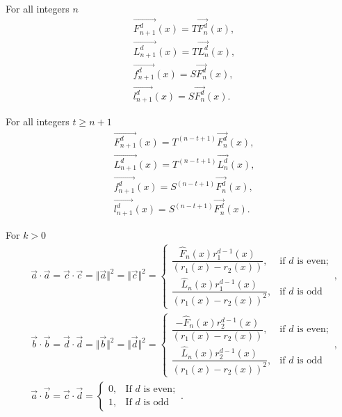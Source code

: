   \begin{theorem}
 For all integers $n$
  \begin{align*}
  &\stackrel{\rightarrow}{F_{n+1}^d}(x) =T \stackrel{\rightarrow}{F_{n}^d}(x),\\ 
  &\stackrel{\rightarrow}{L_{n+1}^d}(x)=T \stackrel{\rightarrow}{L_{n}^d}(x), \\
 & \stackrel{\rightarrow}{f_{n+1}^d}(x) =S \stackrel{\rightarrow}{F_{n}^d}(x),\\ 
  &\stackrel{\rightarrow}{l_{n+1}^d}(x) =S \stackrel{\rightarrow}{F_{n}^d}(x). 
 \end{align*}
 \end{theorem} 
 \begin{theorem}
For all integers $t\geq n + 1$
  \begin{align*}
   &\stackrel{\rightarrow}{F_{n+1}^d}(x) =T^{(n-t+1)} \stackrel{\rightarrow}{F_{n}^d}(x),\\ 
  & \stackrel{\rightarrow}{L_{n+1}^d}(x) =T^{(n-t+1)} \stackrel{\rightarrow}{L_{n}^d}(x),\\
 & \stackrel{\rightarrow}{f_{n+1}^d}(x) =S^{(n-t+1)} \stackrel{\rightarrow}{F_{n}^d}(x),\\
  &\stackrel{\rightarrow}{l_{n+1}^d}(x) =S^{(n-t+1)} \stackrel{\rightarrow}{F_{n}^d}(x). 
\end{align*}
\end{theorem}
\begin{theorem} For $k > 0$
\begin{align*}
&\stackrel{\rightarrow}{a}\cdot  \stackrel{\rightarrow}{a} = \stackrel{\rightarrow}{c}\cdot  \stackrel{\rightarrow}{c} = \Vert \stackrel{\rightarrow}{a} \Vert^2 = \Vert \stackrel{\rightarrow}{c} \Vert^2  =
 \begin{cases}
 \dfrac{\widehat{F}_{n}(x)r_1^{d-1}(x)}{(r_1(x) - r_2(x))}, & \text {if $d$ is even};\\
\dfrac{\widehat{L}_{n}(x)r_1^{d-1}(x)}{(r_1(x) - r_2(x))^2}, & \text{if $d$ is odd}
 \end{cases},\\
 &\stackrel{\rightarrow}{b}\cdot  \stackrel{\rightarrow}{b}=\stackrel{\rightarrow}{d}\cdot  \stackrel{\rightarrow}{d}  =  \Vert \stackrel{\rightarrow}{b} \Vert^2 = \Vert \stackrel{\rightarrow}{d} \Vert^2 =
 \begin{cases}
 \dfrac{- \widehat{F}_{n}(x)r_2^{d-1}(x)}{(r_1(x) - r_2(x))}, & \text {if $d$ is even};\\
\dfrac{\widehat{L}_{n}(x)r_2^{d-1}(x)}{(r_1(x) - r_2(x))^2}, & \text{if $d$ is odd}
 \end{cases},\\
&\stackrel{\rightarrow}{a}\cdot  \stackrel{\rightarrow}{b} = \stackrel{\rightarrow}{c}\cdot  \stackrel{\rightarrow}{d}  =
 \begin{cases}
 0, & \text {If $d$ is even};\\
 1, & \text{If $d$ is odd}
 \end{cases}.
\end{align*}
\end{theorem}
